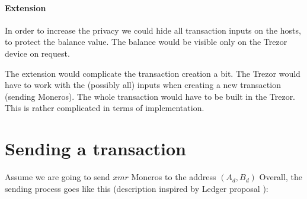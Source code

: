 \documentclass[]{article}
\begin{document}
\paragraph{Extension} In order to increase the privacy we could hide 
all transaction inputs on the hosts, to protect the balance value. The balance would be visible only on the Trezor device on request.

The extension would complicate the transaction creation a bit. The Trezor would have to work with the (possibly all) inputs when creating a new transaction (sending Moneros). The whole transaction would have to be built in the Trezor. This is rather complicated in terms of implementation. 

 
\section{Sending a transaction}
Assume we are going to send $xmr$ Moneros to the address $(A_d, B_d)$
Overall, the sending process goes like this (description inspired by Ledger proposal \cite{ledger_doc}):
\end{document}
